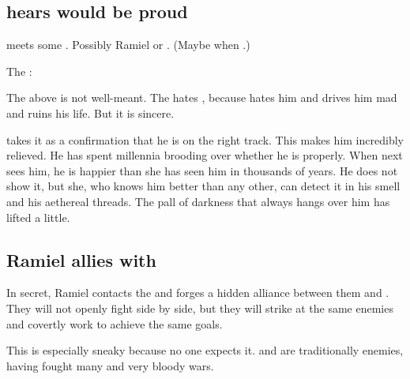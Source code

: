 \begin{garbage}
\subsection{\Ishnaruchaefir{} hears \Nexagglachel{} would be proud}
\Ishnaruchaefir{} meets some \sathariah. 
Possibly Ramiel or \Azraid. 
(Maybe when .) 

\begin{prose}
  The \sathariah: 
\end{prose}

The above is not well-meant. 
The \sathariah{} hates \Nexagglachel, because \Nexagglachel{} hates him and drives him mad and ruins his life. 
But it is sincere. 

\Ishnaruchaefir{} takes it as a confirmation that he is on the right track. 
This makes him incredibly relieved. 
He has spent millennia brooding over whether he is  properly. 
When \Criseis{} next sees him, he is happier than she has seen him in thousands of years. 
He does not show it, but she, who knows him better than any other, can detect it in his smell and his aethereal threads. 
The pall of darkness that always hangs over him has lifted a little. 










\subsection{Ramiel allies with \Baelzerach}
In secret, Ramiel contacts the \Baelzerach{} and forges a hidden alliance between them and \Mystraacht. They will not openly fight side by side, but they will strike at the same enemies and covertly work to achieve the same goals. 

This is especially sneaky because no one expects it. \Mystraacht{} and \Baelzerach{} are traditionally enemies, having fought many and very bloody wars. 










\end{garbage}
